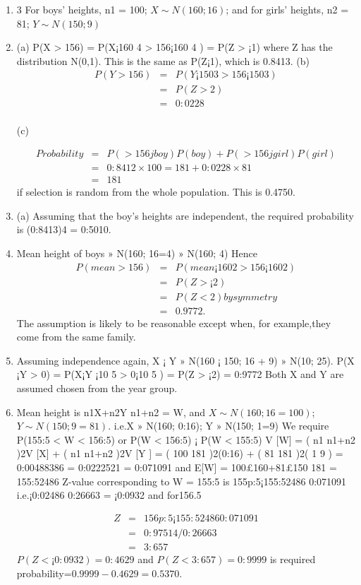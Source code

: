 \documentclass[a4paper,12pt]{article}
\begin{document}
\begin{enumerate}
    \item 3 For boys’ heights, n1 = 100; $X \sim N(160; 16)$; and for girls’ heights, n2 = 81; $Y \sim N(150; 9)$
\item (a) P(X > 156) = P(X¡160
4 > 156¡160
4 ) = P(Z > ¡1) where Z has the distribution
N(0,1). This is the same as P(Z¡1), which is 0.8413.
(b) 
\begin{eqnarray*}
  P(Y > 156) &=& P(Y ¡150
3 > 156¡150
3 ) \\ &=& P(Z > 2)\\ &=& 0:0228  \\
\end{eqnarray*}

(c)

\begin{eqnarray*}
Probability&=&P(> 156jboy)P(boy) + P(> 156jgirl)P(girl)\\ &=& 0:8412 \times 100=181 +
0:0228 \times 81 \\&=&181
\end{eqnarray*} if selection is random from the whole population. This is 0.4750.
\item (a) Assuming that the boy’s heights are independent, the required probability is (0:8413)4
= 0:5010.
\item Mean height of boys » N(160; 16=4) » N(160; 4)
Hence 
\begin{eqnarray*}
P(mean > 156) &=& P(mean¡160
2 > 156¡160
2 ) \\ &=& P(Z > ¡2) \\ &=& P(Z < 2) by
symmetry\\ &=& 0.9772.
\end{eqnarray*}
The assumption is likely to be reasonable except when, for example,they come from
the same family.
\item Assuming independence again, X ¡ Y » N(160 ¡ 150; 16 + 9) » N(10; 25).
P(X ¡Y > 0) = P(X¡Y ¡10
5 > 0¡10
5 ) = P(Z > ¡2) = 0:9772 Both X and Y are assumed
chosen from the year group.
\item  Mean height is n1X+n2Y
n1+n2
= W, and $X \sim N(160; 16=100)$; $Y \sim N(150; 9=81)$. i.e.X »
N(160; 0:16); Y » N(150; 1=9) We require P(155:5 < W < 156:5) or P(W < 156:5) ¡
P(W < 155:5)
V [W] = ( n1
n1+n2
)2V [X] + ( n1
n1+n2
)2V [Y ] = ( 100
181 )2(0:16) + ( 81
181 )2( 1
9 ) = 0:00488386 =
0:0222521 = 0:071091 and E[W] = 100£160+81£150
181 = 155:52486
Z-value corresponding to W = 155:5 is 155p:5¡155:52486
0:071091
i.e.¡0:02486
0:26663 = ¡0:0932 and for156.5

\begin{eqnarray*}
Z &=& 156p:5¡155:52486
0:071091 \\ 
&=& 0:97514 /  0:26663 \\ 
&=& 3:657
\end{eqnarray*}
$P(Z < ¡0:0932) = 0:4629$ and $P(Z < 3:657) = 0:9999$ is required probability=$0.9999-
0.4629=0.5370$.

\end{enumerate}
\end{document}
